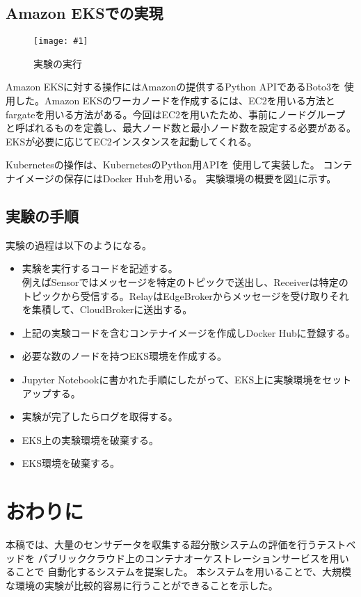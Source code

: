 \documentclass[submit,techrep]{ipsj}
\newcommand{\reffig}[1]{図\ref{#1}}
\newcommand{\epsfig}[4]{
\begin{figure}[tb]
  \begin{center}
    \texttt{[image: \#1]}
  \end{center}
  \caption{#3}
  \label{#4}
\end{figure}}
\newcommand{\kbs}{Kubernetes}
\begin{document}
\subsection{Amazon EKSでの実現}

\epsfig{figs/experiment.pdf}{width=8.5cm}{実験の実行}{experiment}

Amazon EKSに対する操作にはAmazonの提供するPython APIであるBoto3\cite{boto3}を
使用した。Amazon EKSのワーカノードを作成するには、EC2を用いる方法と
fargateを用いる方法がある。今回はEC2を用いたため、事前にノードグループ
と呼ばれるものを定義し、最大ノード数と最小ノード数を設定する必要がある。
EKSが必要に応じてEC2インスタンスを起動してくれる。

\kbs の操作は、\kbs のPython用API\cite{kubernetes-python-client}を
使用して実装した。
コンテナイメージの保存にはDocker Hub\cite{dockerhub}を用いる。
実験環境の概要を\reffig{experiment}に示す。

\subsection{実験の手順}
実験の過程は以下のようになる。
\begin{itemize}
  \item 実験を実行するコードを記述する。\\例えばSensorではメッセージを特定のトピックで送出し、Receiverは特定のトピックから受信する。RelayはEdgeBrokerからメッセージを受け取りそれを集積して、CloudBrokerに送出する。
  \item 上記の実験コードを含むコンテナイメージを作成しDocker Hubに登録する。
  \item 必要な数のノードを持つEKS環境を作成する。
  \item Jupyter Notebookに書かれた手順にしたがって、EKS上に実験環境をセットアップする。
  \item 実験が完了したらログを取得する。
  \item EKS上の実験環境を破棄する。
  \item EKS環境を破棄する。
\end{itemize}



\section{おわりに}\label{sec:conclusion}
本稿では、大量のセンサデータを収集する超分散システムの評価を行うテストベッドを
パブリッククラウド上のコンテナオーケストレーションサービスを用いることで
自動化するシステムを提案した。
本システムを用いることで、大規模な環境の実験が比較的容易に行うことができることを示した。
\end{document}
